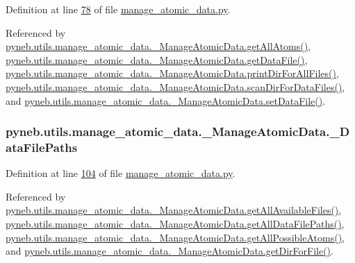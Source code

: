 Definition at line \hyperlink{manage__atomic__data_8py_source_l00078}{78} of file \hyperlink{manage__atomic__data_8py_source}{manage\-\_\-atomic\-\_\-data.\-py}.



Referenced by \hyperlink{manage__atomic__data_8py_source_l00277}{pyneb.\-utils.\-manage\-\_\-atomic\-\_\-data.\-\_\-\-Manage\-Atomic\-Data.\-get\-All\-Atoms()}, \hyperlink{manage__atomic__data_8py_source_l00297}{pyneb.\-utils.\-manage\-\_\-atomic\-\_\-data.\-\_\-\-Manage\-Atomic\-Data.\-get\-Data\-File()}, \hyperlink{manage__atomic__data_8py_source_l00172}{pyneb.\-utils.\-manage\-\_\-atomic\-\_\-data.\-\_\-\-Manage\-Atomic\-Data.\-print\-Dir\-For\-All\-Files()}, \hyperlink{manage__atomic__data_8py_source_l00358}{pyneb.\-utils.\-manage\-\_\-atomic\-\_\-data.\-\_\-\-Manage\-Atomic\-Data.\-scan\-Dir\-For\-Data\-Files()}, and \hyperlink{manage__atomic__data_8py_source_l00380}{pyneb.\-utils.\-manage\-\_\-atomic\-\_\-data.\-\_\-\-Manage\-Atomic\-Data.\-set\-Data\-File()}.

\hypertarget{classpyneb_1_1utils_1_1manage__atomic__data_1_1___manage_atomic_data_a92da10ed6b2395c54f88300c05a71ae9}{
\subsubsection[{\-\_\-\-Data\-File\-Paths}]{\setlength{\rightskip}{0pt plus 5cm}pyneb.\-utils.\-manage\-\_\-atomic\-\_\-data.\-\_\-\-Manage\-Atomic\-Data.\-\_\-\-Data\-File\-Paths\hspace{0.3cm}{\ttfamily [private]}}}\label{classpyneb_1_1utils_1_1manage__atomic__data_1_1___manage_atomic_data_a92da10ed6b2395c54f88300c05a71ae9}


Definition at line \hyperlink{manage__atomic__data_8py_source_l00104}{104} of file \hyperlink{manage__atomic__data_8py_source}{manage\-\_\-atomic\-\_\-data.\-py}.



Referenced by \hyperlink{manage__atomic__data_8py_source_l00190}{pyneb.\-utils.\-manage\-\_\-atomic\-\_\-data.\-\_\-\-Manage\-Atomic\-Data.\-get\-All\-Available\-Files()}, \hyperlink{manage__atomic__data_8py_source_l00136}{pyneb.\-utils.\-manage\-\_\-atomic\-\_\-data.\-\_\-\-Manage\-Atomic\-Data.\-get\-All\-Data\-File\-Paths()}, \hyperlink{manage__atomic__data_8py_source_l00242}{pyneb.\-utils.\-manage\-\_\-atomic\-\_\-data.\-\_\-\-Manage\-Atomic\-Data.\-get\-All\-Possible\-Atoms()}, and \hyperlink{manage__atomic__data_8py_source_l00144}{pyneb.\-utils.\-manage\-\_\-atomic\-\_\-data.\-\_\-\-Manage\-Atomic\-Data.\-get\-Dir\-For\-File()}.

